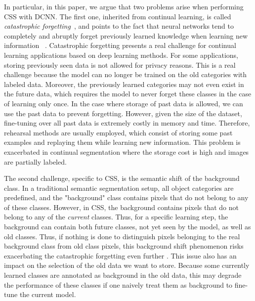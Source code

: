 In particular, in this paper, we argue that two problems arise when performing \ac{CSS} with \acs{DCNN}. The
first one, inherited from continual learning, is called \textit{catastrophic
    forgetting}~\cite{robins1995catastrophicforgetting,french1999catastrophicforgetting,thrun1998lifelonglearning},
and points to the fact that neural networks tend to completely and abruptly forget previously
learned knowledge when learning new information ~\cite{kemker2018measuringforgetting}. Catastrophic
forgetting presents a real challenge for continual learning applications based on deep learning
methods. For some applications, storing previously seen data is not allowed for privacy reasons.
This is a real challenge because the model can no longer be trained on the old categories with
labeled data. Moreover, the previously learned categories may not even exist in the future data,
which requires the model to never forget these classes in the case of learning only once. In the
case where storage of past data is allowed, we can use the past data to prevent forgetting. However,
given the size of the dataset, fine-tuning over all past data is extremely costly in memory and
time. Therefore, rehearsal methods are usually employed, which consist of storing some past
examples and replaying them while learning new information. This problem is exacerbated in continual
segmentation where the storage cost is high and images are partially labeled.

The second challenge, specific to \ac{CSS}, is the semantic shift of the background class. In a
traditional semantic segmentation setup, all object categories are predefined, and the "background"
class contains pixels that do not belong to any of these classes. However, in \ac{CSS}, the background
contains pixels that do not belong to any of the \textit{current} classes. Thus, for a specific
learning step, the background can contain both future classes, not yet seen by the model, as well as
old classes. Thus, if nothing is done to distinguish pixels belonging to the real background class
from old class pixels, this background shift phenomenon risks exacerbating the catastrophic
forgetting even further \cite{cermelli2020modelingthebackground}. This issue also has an impact on
the selection of the old data we want to store. Because some currently learned classes are annotated
as background in the old data, this may degrade the performance of these classes if one naively
treat them as background to fine-tune the current model.

